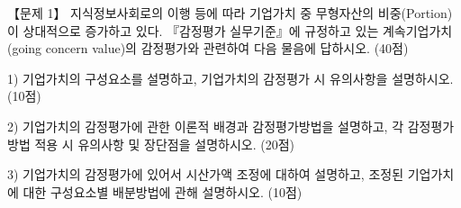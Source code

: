 \begin{longquestion}{【문제 1】}
지식정보사회로의 이행 등에 따라 기업가치 중 무형자산의 비중(Portion)이 상대적으로 증가하고 있다. 『감정평가 실무기준』에 규정하고 있는 계속기업가치(going concern value)의 감정평가와 관련하여 다음 물음에 답하시오. (40점) \par
1) 기업가치의 구성요소를 설명하고, 기업가치의 감정평가 시 유의사항을 설명하시오. (10점) \par
2) 기업가치의 감정평가에 관한 이론적 배경과 감정평가방법을 설명하고, 각 감정평가방법 적용 시 유의사항 및 장단점을 설명하시오. (20점) \par
3) 기업가치의 감정평가에 있어서 시산가액 조정에 대하여 설명하고, 조정된 기업가치에 대한 구성요소별 배분방법에 관해 설명하시오. (10점) \par
\end{longquestion}
